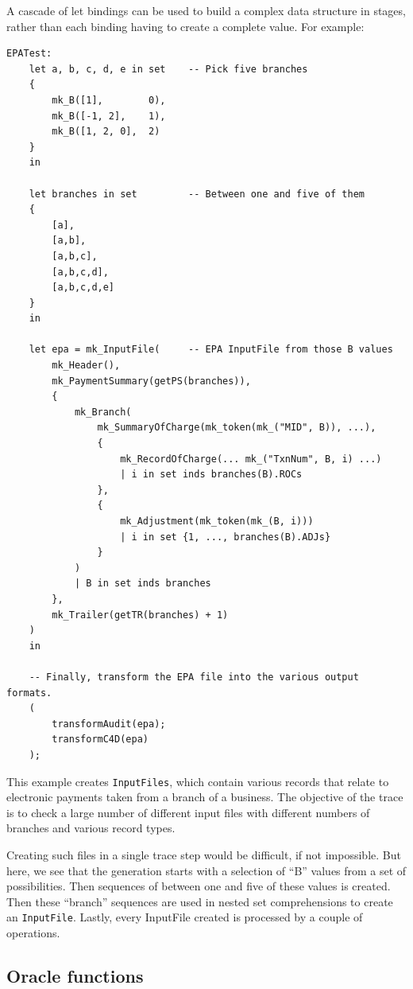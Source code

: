 \documentclass{overturerepchap}
\begin{document}
A cascade of let bindings can be used to build a complex data structure in
stages, rather than each binding having to create a complete value. For example:
\scriptsize
\begin{lstlisting}
EPATest:
    let a, b, c, d, e in set    -- Pick five branches
    {
        mk_B([1],        0),
        mk_B([-1, 2],    1),
        mk_B([1, 2, 0],  2)
    }
    in

    let branches in set         -- Between one and five of them
    {
        [a],
        [a,b],
        [a,b,c],
        [a,b,c,d],
        [a,b,c,d,e]
    }
    in
 
    let epa = mk_InputFile(     -- EPA InputFile from those B values
        mk_Header(),
        mk_PaymentSummary(getPS(branches)),
        {
            mk_Branch(
                mk_SummaryOfCharge(mk_token(mk_("MID", B)), ...),
                {
                    mk_RecordOfCharge(... mk_("TxnNum", B, i) ...)
                    | i in set inds branches(B).ROCs
                },
                {
                    mk_Adjustment(mk_token(mk_(B, i)))
                    | i in set {1, ..., branches(B).ADJs}
                }
            )
            | B in set inds branches
        },
        mk_Trailer(getTR(branches) + 1)
    )
    in

    -- Finally, transform the EPA file into the various output formats.
    (
        transformAudit(epa);
        transformC4D(epa)
    );
\end{lstlisting}
\normalsize

This example creates \texttt{InputFiles}, which contain various records that
relate to electronic payments taken from a branch of a business. The objective of the
trace is to check a large number of different input files with different numbers
of branches and various record types.

Creating such files in a single trace step would be difficult, if not
impossible. But here, we see that the generation starts with a selection of
``B'' values from a set of possibilities. Then sequences of between one and five
of these values is created. Then these ``branch'' sequences are used in nested
set comprehensions to create an \texttt{InputFile}. Lastly, every InputFile
created is processed by a couple of operations.

\subsection{Oracle functions}
\end{document}
